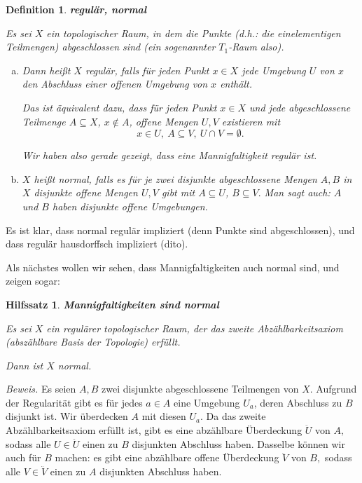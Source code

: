 \documentclass[12pt]{scrbook}   %
\newtheorem{hilfsX}[alles]{Hilfssatz}
\newenvironment{hilfs}[1]{\begin{hilfsX}{\bf #1}\par}{\end{hilfsX}}
\newtheorem{definiX}[alles]{Definition}
\newenvironment{defini}[1]{\begin{definiX}{\bf #1}\par\rm}{\end{definiX}}
\begin{document}
\begin{defini} {regul\"ar, normal}
Es sei $X$ ein topologischer Raum, in dem die Punkte (d.h.: die 
einelementigen Teilmengen) abgeschlossen sind (ein sogenannter $T_1$-Raum also).

\begin{enumerate}[a)]
\item
Dann heißt $X$ {\it regul\"ar}, falls f\"ur jeden Punkt
$x\in X$ jede Umgebung $U$ von $x$ den Abschluss einer offenen Umgebung von $x$
enth\"alt. 

Das ist \"aquivalent dazu, dass f\"ur jeden Punkt $x\in X$ und jede 
abgeschlossene Teilmenge $A\subseteq X$, $x\notin A$, offene Mengen $U,V$ existieren mit
$$x\in U,\ A\subseteq V,\ U\cap V = \emptyset.$$

Wir haben also gerade gezeigt, dass eine Mannigfaltigkeit regul\"ar
ist.

\item
$X$ heißt {\it normal}, falls es f\"ur je zwei disjunkte
abgeschlossene Mengen $A,B$ in $X$ disjunkte offene Mengen $U,V$ gibt mit
$A\subseteq U$, $B\subseteq V.$ Man sagt auch: $A$ und $B$ haben disjunkte 
offene Umgebungen.
\end{enumerate}
\end{defini}
Es ist klar, dass normal regul\"ar impliziert (denn Punkte sind abgeschlossen),
und dass regul\"ar hausdorffsch impliziert (dito).

Als n\"achstes wollen wir sehen, dass Mannigfaltigkeiten auch normal sind, und 
zeigen sogar:

\begin{hilfs} {Mannigfaltigkeiten sind normal}
Es sei $X$ ein regul\"arer topologischer Raum, der das zweite 
Abz\"ahlbarkeitsaxiom (abszählbare Basis der Topologie) erf\"ullt.

Dann ist $X$ normal.
\end{hilfs}

{\it Beweis.}
Es seien $A,B$ zwei disjunkte abgeschlossene Teilmengen von $X.$ Aufgrund der
Regularit\"at gibt es f\"ur jedes $a\in A$ eine Umgebung $U_a$, deren 
Abschluss zu $B$ disjunkt ist. Wir \"uberdecken $A$ mit diesen $U_a.$ Da das
zweite Abz\"ahlbarkeitsaxiom erf\"ullt ist, gibt es eine abz\"ahlbare 
\"Uberdeckung $\ddot U$ von $A,$ sodass alle $U\in\ddot U$ einen zu $B$ 
disjunkten Abschluss haben. Dasselbe k\"onnen wir auch f\"ur $B$ machen: es 
gibt eine abz\"ahlbare offene \"Uberdeckung $\ddot V$ von $B,$ sodass alle
$V\in \ddot V$ einen zu $A$ disjunkten Abschluss haben.
\end{document}
